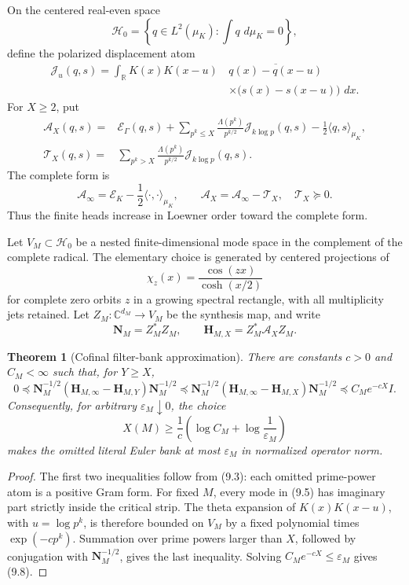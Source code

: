 \documentclass[11pt]{amsart}
\newtheorem{theorem}{Theorem}[section]
\theoremstyle{definition}
\theoremstyle{remark}
\newcommand{\dd}{\,d}
\begin{document}
On the centered real-even space
\[
 \mathcal H_0=\left\{q\in L^2(\mu_K):\int q\,\dd\mu_K=0\right\},
\tag{9.1}
\]
define the polarized displacement atom
\[
\begin{aligned}
 \mathcal J_u(q,s)
 =\int_{\mathbb R}K(x)K(x-u)\,
 &\overline{q(x)-q(x-u)}\\
 &\times\bigl(s(x)-s(x-u)\bigr)\,\dd x .
\end{aligned}
\tag{9.2}
\]
For \(X\ge2\), put
\[
\begin{aligned}
 \mathcal A_X(q,s)
 ={}&\mathscr E_\Gamma(q,s)
 +\sum_{p^k\le X}\frac{\Lambda(p^k)}{p^{k/2}}
       \mathcal J_{k\log p}(q,s)
 -\frac12\langle q,s\rangle_{\mu_K},\\
 \mathcal T_X(q,s)
 ={}&\sum_{p^k>X}\frac{\Lambda(p^k)}{p^{k/2}}
       \mathcal J_{k\log p}(q,s).
\end{aligned}
\tag{9.3}
\]
The complete form is
\[
 \mathcal A_\infty
 =\mathscr E_K-\frac12\langle\cdot,\cdot\rangle_{\mu_K},
\qquad
 \boxed{\mathcal A_X=\mathcal A_\infty-\mathcal T_X,\quad
        \mathcal T_X\succeq0.}
\tag{9.4}
\]
Thus the finite heads increase in Loewner order toward the complete form.

Let \(V_M\subset\mathcal H_0\) be a nested finite-dimensional mode space
in the complement of the complete radical.  The elementary choice is
generated by centered projections of
\[
 \chi_z(x)=\frac{\cos(zx)}{\cosh(x/2)}
\tag{9.5}
\]
for complete zero orbits \(z\) in a growing spectral rectangle, with all
multiplicity jets retained.  Let \(Z_M:\mathbb C^{d_M}\to V_M\) be the
synthesis map, and write
\[
 \mathbf N_M=Z_M^*Z_M,\qquad
 \mathbf H_{M,X}=Z_M^*\mathcal A_XZ_M .
\tag{9.6}
\]

\begin{theorem}[Cofinal filter-bank approximation]
\label{thm:cofinal-filter-bank}
There are constants \(c>0\) and \(C_M<\infty\) such that, for \(Y\ge X\),
\[
 \boxed{
 0\preceq
 \mathbf N_M^{-1/2}
 (\mathbf H_{M,\infty}-\mathbf H_{M,Y})
 \mathbf N_M^{-1/2}
 \preceq
 \mathbf N_M^{-1/2}
 (\mathbf H_{M,\infty}-\mathbf H_{M,X})
 \mathbf N_M^{-1/2}
 \preceq C_Me^{-cX}I.}
\tag{9.7}
\]
Consequently, for arbitrary \(\varepsilon_M\downarrow0\), the choice
\[
 X(M)\ge\frac1c
 \left(\log C_M+\log\frac1{\varepsilon_M}\right)
\tag{9.8}
\]
makes the omitted literal Euler bank at most \(\varepsilon_M\) in
normalized operator norm.
\end{theorem}

\begin{proof}
The first two inequalities follow from (9.3): each omitted prime-power
atom is a positive Gram form.  For fixed \(M\), every mode in (9.5) has
imaginary part strictly inside the critical strip.  The theta expansion of
\(K(x)K(x-u)\), with \(u=\log p^k\), is therefore bounded on \(V_M\) by a
fixed polynomial times \(\exp(-c p^k)\).  Summation over prime powers
larger than \(X\), followed by conjugation with \(\mathbf N_M^{-1/2}\),
gives the last inequality.  Solving \(C_Me^{-cX}\le\varepsilon_M\)
gives (9.8).
\end{proof}
\end{document}
